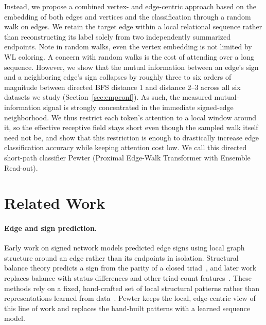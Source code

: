 \documentclass[sigconf, review, anonymous]{acmart}
\theoremstyle{plain}
\theoremstyle{definition}
\begin{document}
Instead, we propose a combined vertex- and edge-centric approach based on the embedding of both edges and vertices and the classification through a random walk on edges. We retain the target edge within a local relational sequence rather than reconstructing its label solely from two independently summarized endpoints. Note in random walks, even the vertex embedding is not limited by WL coloring.  A concern with random walks is the cost of attending over a long sequence. However, we show that the mutual information between an edge's sign and a neighboring edge's sign collapses by roughly three to six orders of magnitude between directed BFS distance 1 and distance 2--3 across all six datasets we study (Section~\ref{sec:empconf}). As such, the measured mutual-information signal is strongly concentrated in the immediate signed-edge neighborhood. We thus restrict each token's attention to a local window around it, so the effective receptive field stays short even though the sampled walk itself need not be, and show that this restriction is enough to drastically increase edge classification accuracy while keeping attention cost low. We call this directed short-path classifier Pewter (Proximal Edge-Walk Transformer with Ensemble Read-out).

\section{Related Work}
\paragraph{Edge and sign prediction.} Early work on signed network models predicted edge signs using local graph structure around an edge rather than its endpoints in isolation. Structural balance theory predicts a sign from the parity of a closed triad~\citep{cartwright1956structural}, and later work replaces balance with status differences and other triad-count features~\citep{leskovec2010predicting}. These methods rely on a fixed, hand-crafted set of local structural patterns rather than representations learned from data~\citep{naaman2019edge}. Pewter keeps the local, edge-centric view of this line of work and replaces the hand-built patterns with a learned sequence model.
\end{document}
